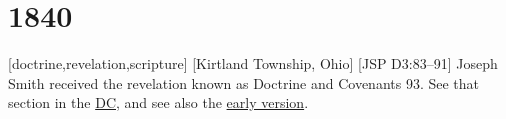 \section{1840} %


	
	[doctrine,revelation,scripture]
	[Kirtland Township, Ohio] %
	[JSP D3:83--91] %
	{Joseph Smith received the revelation known as Doctrine and Covenants 93. See that section in the \hyperref[DC93]{DC}, and see also the \hyperref[EMS-1833-JS-6-MAY-1833]{early version}.} %
	






